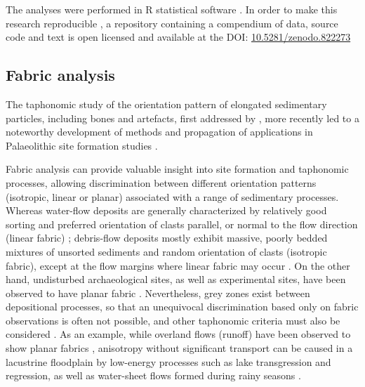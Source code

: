 \documentclass[preprint,authoryear,times]{elsarticle} %
\begin{document}
The analyses were performed in \textsf{R} statistical software \citep{RCoreTeam2017}. In order to make this research reproducible \citep{Marwick2017,Marwick2017a}, a repository containing a compendium of data, source code and text is open licensed and available at the DOI: \href{https://doi.org/10.5281/zenodo.822273}{10.5281/zenodo.822273}

\subsection{Fabric analysis}

The taphonomic study of the orientation pattern of elongated sedimentary particles, including bones and artefacts, first addressed by \cite{Voorhies1969,Isaac1967,Bar-Yosef1972,Schick1986}, more recently led to a noteworthy development of methods and propagation of applications in Palaeolithic site formation studies \citep[][among others]{Bertran1995,Bertran1997,Lenoble2004,Lenoble2008,McPherron2005,Benito-Calvo2009,Benito-Calvo2011a,Benito-Calvo2011,Bernatchez2010,Boschian2010,Dominguez-Rodrigo2012,Dominguez-Rodrigo2013,Dominguez-Rodrigo2014,Torre2013a,Walter2013,Garcia-Moreno2016,Sanchez-Romero2016}.

Fabric analysis can provide valuable insight into site formation and taphonomic processes, allowing discrimination between different orientation patterns (isotropic, linear or planar) associated with a range of sedimentary processes. Whereas water-flow deposits are generally characterized by relatively good sorting and preferred orientation of clasts parallel, or normal to the flow direction (linear fabric) \citep{Petraglia1994}; debris-flow deposits mostly exhibit massive, poorly bedded mixtures of unsorted sediments and random orientation of clasts (isotropic fabric), except at the flow margins where linear fabric may occur \citep{Pierson2005}. On the other hand, undisturbed archaeological sites, as well as experimental sites, have been observed to have planar fabric \citep{Bertran1997,Lenoble2004}. Nevertheless, grey zones exist between depositional processes, so that an unequivocal discrimination based only on fabric observations is often not possible, and other taphonomic criteria must also be considered \citep{Lenoble2004}. As an example, while overland flows (runoff) have been observed to show planar fabrics \citep{Lenoble2004}, anisotropy without significant transport can be caused in a lacustrine floodplain by low-energy processes such as lake transgression and regression, as well as water-sheet flows formed during rainy seasons \citep{Cobo-Sanchez2014}.
\end{document}
